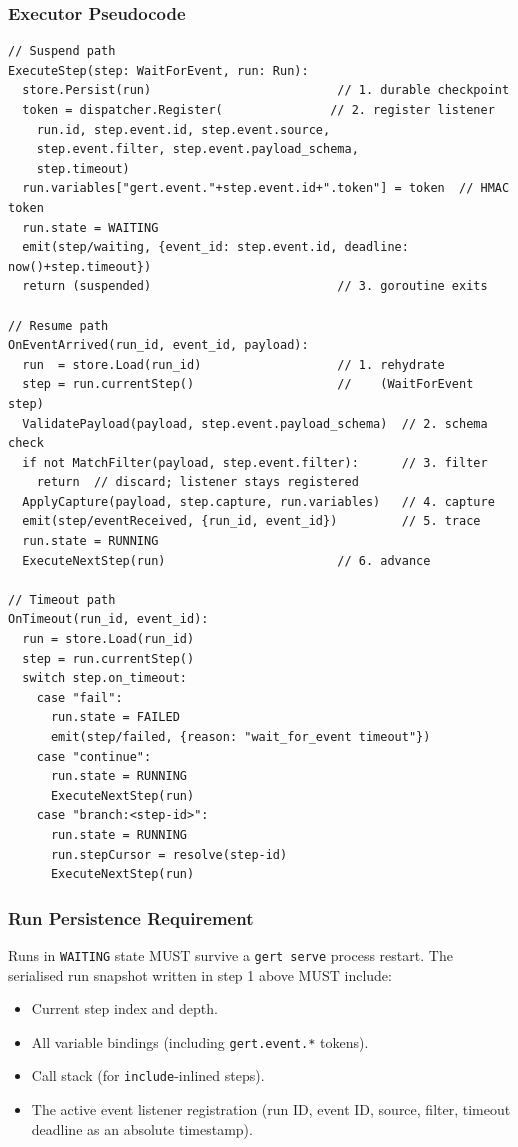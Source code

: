 \subsubsection*{Executor Pseudocode}

\begin{verbatim}
// Suspend path
ExecuteStep(step: WaitForEvent, run: Run):
  store.Persist(run)                          // 1. durable checkpoint
  token = dispatcher.Register(               // 2. register listener
    run.id, step.event.id, step.event.source,
    step.event.filter, step.event.payload_schema,
    step.timeout)
  run.variables["gert.event."+step.event.id+".token"] = token  // HMAC token
  run.state = WAITING
  emit(step/waiting, {event_id: step.event.id, deadline: now()+step.timeout})
  return (suspended)                          // 3. goroutine exits

// Resume path
OnEventArrived(run_id, event_id, payload):
  run  = store.Load(run_id)                   // 1. rehydrate
  step = run.currentStep()                    //    (WaitForEvent step)
  ValidatePayload(payload, step.event.payload_schema)  // 2. schema check
  if not MatchFilter(payload, step.event.filter):      // 3. filter
    return  // discard; listener stays registered
  ApplyCapture(payload, step.capture, run.variables)   // 4. capture
  emit(step/eventReceived, {run_id, event_id})         // 5. trace
  run.state = RUNNING
  ExecuteNextStep(run)                        // 6. advance

// Timeout path
OnTimeout(run_id, event_id):
  run = store.Load(run_id)
  step = run.currentStep()
  switch step.on_timeout:
    case "fail":
      run.state = FAILED
      emit(step/failed, {reason: "wait_for_event timeout"})
    case "continue":
      run.state = RUNNING
      ExecuteNextStep(run)
    case "branch:<step-id>":
      run.state = RUNNING
      run.stepCursor = resolve(step-id)
      ExecuteNextStep(run)
\end{verbatim}

\subsubsection*{Run Persistence Requirement}

Runs in \texttt{WAITING} state MUST survive a \texttt{gert serve} process restart. The
serialised run snapshot written in step 1 above MUST include:

\begin{itemize}
  \item Current step index and depth.
  \item All variable bindings (including \texttt{gert.event.*} tokens).
  \item Call stack (for \texttt{include}-inlined steps).
  \item The active event listener registration (run ID, event ID, source, filter, timeout
        deadline as an absolute timestamp).
\end{itemize}

